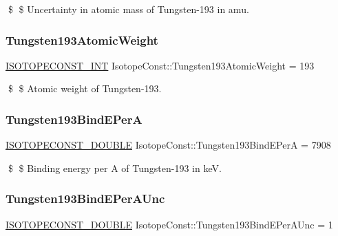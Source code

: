 \$ \$ Uncertainty in atomic mass of Tungsten-\/193 in amu. \mbox{\label{group___isotope_const-_tungsten-_w193_ga591f8240aa7464aafa61689a35c10f7c}} 
\subsubsection{\texorpdfstring{Tungsten193\+Atomic\+Weight}{Tungsten193AtomicWeight}}
{\footnotesize\ttfamily \mbox{\hyperlink{group___isotope_const-_macros_ga5f18360b3e99483a35c32d789e62621c}{I\+S\+O\+T\+O\+P\+E\+C\+O\+N\+S\+T\+\_\+\+I\+NT}} Isotope\+Const\+::\+Tungsten193\+Atomic\+Weight = 193}

\$ \$ Atomic weight of Tungsten-\/193. \mbox{\label{group___isotope_const-_tungsten-_w193_gaa3a24c1858792c9418b514709cb72a50}} 
\subsubsection{\texorpdfstring{Tungsten193\+Bind\+E\+PerA}{Tungsten193BindEPerA}}
{\footnotesize\ttfamily \mbox{\hyperlink{group___isotope_const-_macros_ga8f45a7272ce02c0b4c65c44636ed719a}{I\+S\+O\+T\+O\+P\+E\+C\+O\+N\+S\+T\+\_\+\+D\+O\+U\+B\+LE}} Isotope\+Const\+::\+Tungsten193\+Bind\+E\+PerA = 7908}

\$ \$ Binding energy per A of Tungsten-\/193 in keV. \mbox{\label{group___isotope_const-_tungsten-_w193_gad3aa2b283326cf20e223022290788d4f}} 
\subsubsection{\texorpdfstring{Tungsten193\+Bind\+E\+Per\+A\+Unc}{Tungsten193BindEPerAUnc}}
{\footnotesize\ttfamily \mbox{\hyperlink{group___isotope_const-_macros_ga8f45a7272ce02c0b4c65c44636ed719a}{I\+S\+O\+T\+O\+P\+E\+C\+O\+N\+S\+T\+\_\+\+D\+O\+U\+B\+LE}} Isotope\+Const\+::\+Tungsten193\+Bind\+E\+Per\+A\+Unc = 1}

